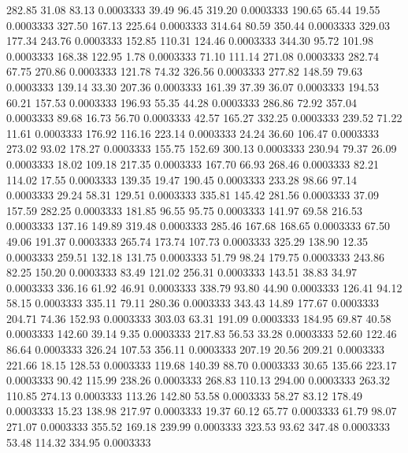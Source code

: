  282.85   31.08   83.13   0.0003333
  39.49   96.45  319.20   0.0003333
 190.65   65.44   19.55   0.0003333
 327.50  167.13  225.64   0.0003333
 314.64   80.59  350.44   0.0003333
 329.03  177.34  243.76   0.0003333
 152.85  110.31  124.46   0.0003333
 344.30   95.72  101.98   0.0003333
 168.38  122.95    1.78   0.0003333
  71.10  111.14  271.08   0.0003333
 282.74   67.75  270.86   0.0003333
 121.78   74.32  326.56   0.0003333
 277.82  148.59   79.63   0.0003333
 139.14   33.30  207.36   0.0003333
 161.39   37.39   36.07   0.0003333
 194.53   60.21  157.53   0.0003333
 196.93   55.35   44.28   0.0003333
 286.86   72.92  357.04   0.0003333
  89.68   16.73   56.70   0.0003333
  42.57  165.27  332.25   0.0003333
 239.52   71.22   11.61   0.0003333
 176.92  116.16  223.14   0.0003333
  24.24   36.60  106.47   0.0003333
 273.02   93.02  178.27   0.0003333
 155.75  152.69  300.13   0.0003333
 230.94   79.37   26.09   0.0003333
  18.02  109.18  217.35   0.0003333
 167.70   66.93  268.46   0.0003333
  82.21  114.02   17.55   0.0003333
 139.35   19.47  190.45   0.0003333
 233.28   98.66   97.14   0.0003333
  29.24   58.31  129.51   0.0003333
 335.81  145.42  281.56   0.0003333
  37.09  157.59  282.25   0.0003333
 181.85   96.55   95.75   0.0003333
 141.97   69.58  216.53   0.0003333
 137.16  149.89  319.48   0.0003333
 285.46  167.68  168.65   0.0003333
  67.50   49.06  191.37   0.0003333
 265.74  173.74  107.73   0.0003333
 325.29  138.90   12.35   0.0003333
 259.51  132.18  131.75   0.0003333
  51.79   98.24  179.75   0.0003333
 243.86   82.25  150.20   0.0003333
  83.49  121.02  256.31   0.0003333
 143.51   38.83   34.97   0.0003333
 336.16   61.92   46.91   0.0003333
 338.79   93.80   44.90   0.0003333
 126.41   94.12   58.15   0.0003333
 335.11   79.11  280.36   0.0003333
 343.43   14.89  177.67   0.0003333
 204.71   74.36  152.93   0.0003333
 303.03   63.31  191.09   0.0003333
 184.95   69.87   40.58   0.0003333
 142.60   39.14    9.35   0.0003333
 217.83   56.53   33.28   0.0003333
  52.60  122.46   86.64   0.0003333
 326.24  107.53  356.11   0.0003333
 207.19   20.56  209.21   0.0003333
 221.66   18.15  128.53   0.0003333
 119.68  140.39   88.70   0.0003333
  30.65  135.66  223.17   0.0003333
  90.42  115.99  238.26   0.0003333
 268.83  110.13  294.00   0.0003333
 263.32  110.85  274.13   0.0003333
 113.26  142.80   53.58   0.0003333
  58.27   83.12  178.49   0.0003333
  15.23  138.98  217.97   0.0003333
  19.37   60.12   65.77   0.0003333
  61.79   98.07  271.07   0.0003333
 355.52  169.18  239.99   0.0003333
 323.53   93.62  347.48   0.0003333
  53.48  114.32  334.95   0.0003333
